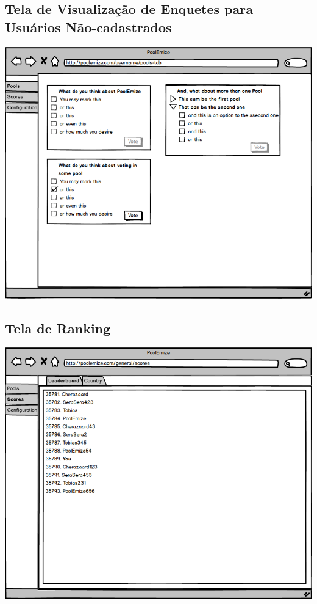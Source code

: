 \documentclass[a4paper,12pt]{article}
\begin{document}
\subsection*{Tela de Visualização de Enquetes para Usuários Não-cadastrados}
\markright{}
\includegraphics[width=15cm]{mockups/GeneralPoollsScreenTab.png}
\subsection*{Tela de Ranking}
\markright{}
\includegraphics[width=15cm]{mockups/GeneralScoreScreenTab.png}
\end{document}
